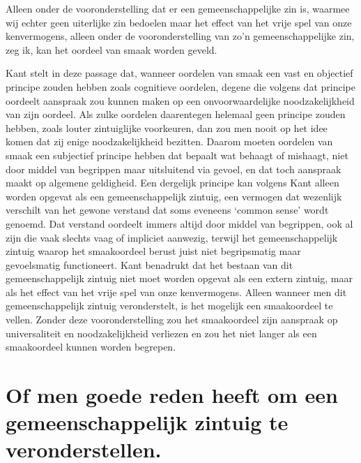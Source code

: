 Alleen onder de vooronderstelling dat er een gemeenschappelijke zin is, waarmee wij echter geen uiterlijke zin bedoelen maar het effect van het vrije spel van onze kenvermogens, alleen onder de vooronderstelling van zo’n gemeenschappelijke zin, zeg ik, kan het oordeel van smaak worden geveld.

\begin{mdframed}[leftmargin=0pt,rightmargin=0pt,backgroundcolor=blue!6,linecolor=white,innertopmargin=6pt,innerbottommargin=6pt]
Kant stelt in deze passage dat, wanneer oordelen van smaak een vast en objectief principe zouden hebben zoals cognitieve oordelen, degene die volgens dat principe oordeelt aanspraak zou kunnen maken op een onvoorwaardelijke noodzakelijkheid van zijn oordeel. Als zulke oordelen daarentegen helemaal geen principe zouden hebben, zoals louter zintuiglijke voorkeuren, dan zou men nooit op het idee komen dat zij enige noodzakelijkheid bezitten. Daarom moeten oordelen van smaak een subjectief principe hebben dat bepaalt wat behaagt of mishaagt, niet door middel van begrippen maar uitsluitend via gevoel, en dat toch aanspraak maakt op algemene geldigheid. Een dergelijk principe kan volgens Kant alleen worden opgevat als een gemeenschappelijk zintuig, een vermogen dat wezenlijk verschilt van het gewone verstand dat soms eveneens ‘common sense’ wordt genoemd. Dat verstand oordeelt immers altijd door middel van begrippen, ook al zijn die vaak slechts vaag of impliciet aanwezig, terwijl het gemeenschappelijk zintuig waarop het smaakoordeel berust juist niet begripsmatig maar gevoelsmatig functioneert. Kant benadrukt dat het bestaan van dit gemeenschappelijk zintuig niet moet worden opgevat als een extern zintuig, maar als het effect van het vrije spel van onze kenvermogens. Alleen wanneer men dit gemeenschappelijk zintuig veronderstelt, is het mogelijk een smaakoordeel te vellen. Zonder deze vooronderstelling zou het smaakoordeel zijn aanspraak op universaliteit en noodzakelijkheid verliezen en zou het niet langer als een smaakoordeel kunnen worden begrepen.

\bigskip

\end{mdframed}

\section{Of men goede reden heeft om een gemeenschappelijk zintuig te veronderstellen.} %

